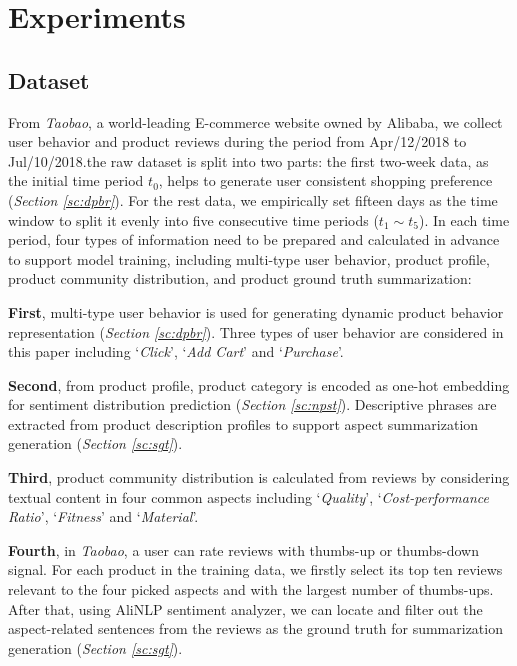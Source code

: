 \section{Experiments} \label{sc:exp} 
\subsection{Dataset}
From \textit{Taobao}, a world-leading E-commerce website owned by Alibaba, we collect user behavior and product reviews during the period from Apr/12/2018 to Jul/10/2018.the raw dataset is split into two parts: the first two-week data, as the initial time period $t_0$, helps to generate user consistent shopping preference (\textit{Section \ref{sc:dpbr}}). For the rest data, we empirically set fifteen days as the time window to split it evenly into five consecutive time periods ($t_{1} \sim t_{5}$). In each time period, four types of information need to be prepared and calculated in advance to support model training, including multi-type user behavior, product profile, product community distribution, and product ground truth summarization: 

\textbf{First}, multi-type user behavior is used for generating dynamic product behavior representation (\textit{Section \ref{sc:dpbr}}). Three types of user behavior are considered in this paper including `\textit{Click}', `\textit{Add Cart}' and `\textit{Purchase}'.

\textbf{Second}, from product profile, product category is encoded as one-hot embedding for sentiment distribution prediction (\textit{Section \ref{sc:npst}}). Descriptive phrases are extracted from product description profiles to support aspect summarization generation (\textit{Section \ref{sc:sgt}}). 

\textbf{Third}, product community distribution is calculated from reviews  by considering textual content in four common aspects including `\textit{Quality}', `\textit{Cost-performance Ratio}', `\textit{Fitness}' and `\textit{Material}'.

\textbf{Fourth}, in \textit{Taobao}, a user can rate reviews with thumbs-up or thumbs-down signal. For each product in the training data, we firstly select its top ten reviews relevant to the four picked aspects and with the largest number of thumbs-ups. After that, using AliNLP sentiment analyzer, we can locate and filter out the aspect-related sentences from the reviews as the ground truth for summarization generation (\textit{Section \ref{sc:sgt}}).  

